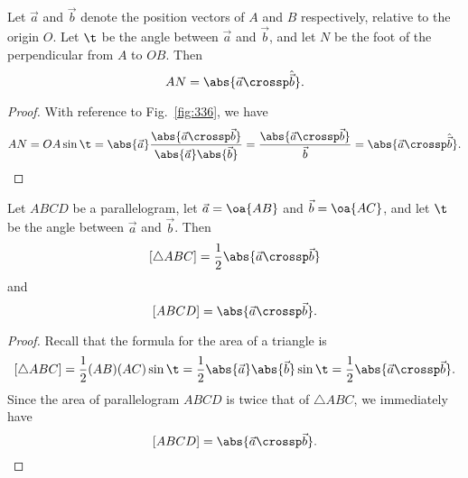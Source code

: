 \begin{proposition}
    Let $\vec a$ and $\vec b$ denote the position vectors of $A$ and $B$ respectively, relative to the origin $O$. Let $\t$ be the angle between $\vec a$ and $\vec b$, and let $N$ be the foot of the perpendicular from $A$ to $OB$. Then \[AN = \abs{\vec a \crossp \hat{\vec b}}.\]
\end{proposition}
\begin{proof}
    With reference to Fig.~\ref{fig:336}, we have \[AN = OA \sin \t = \abs{\vec a} \frac{\abs{\vec a \crossp \vec b}}{\abs{\vec a}\abs{\vec b}} = \frac{\abs{\vec a \crossp \vec b}}{\vec b} = \abs{\vec a \crossp \hat{\vec b}}.\]
\end{proof}

\begin{proposition}
    Let $ABCD$ be a parallelogram, let $\vec a = \oa{AB}$ and $\vec b = \oa{AC}$, and let $\t$ be the angle between $\vec a$ and $\vec b$. Then \[[\triangle ABC] = \frac12 \abs{\vec a \crossp \vec b}\] and \[[ABCD] = \abs{\vec a \crossp \vec b}.\]
\end{proposition}
\begin{proof}
    Recall that the formula for the area of a triangle is \[[\triangle ABC] = \frac12 (AB)(AC) \sin \t = \frac12 \abs{\vec a} \abs{\vec b} \sin \t = \frac12 \abs{\vec a \crossp \vec b}.\] Since the area of parallelogram $ABCD$ is twice that of $\triangle ABC$, we immediately have \[[ABCD] = \abs{\vec a \crossp \vec b}.\]
\end{proof}